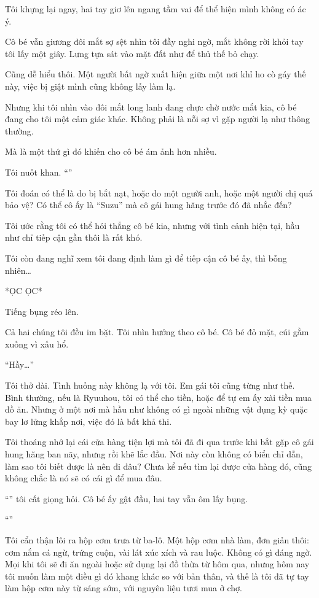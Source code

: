 \documentclass[../main.tex]{subfiles}
\begin{document}
Tôi khựng lại ngay, hai tay giơ lên ngang tầm vai để thể hiện mình không có ác ý. 

Cô bé vẫn giương đôi mắt sợ sệt nhìn tôi đầy nghi ngờ, mắt không rời khỏi tay tôi lấy một giây. Lưng tựa sát vào mặt đất như để thủ thế bỏ chạy.

Cũng dễ hiểu thôi. Một người bất ngờ xuất hiện giữa một nơi khỉ ho cò gáy thế này, việc bị giật mình cũng không lấy làm lạ.

Nhưng khi tôi nhìn vào đôi mắt long lanh đang chực chờ nước mắt kia, cô bé đang cho tôi một cảm giác khác. Không phải là nỗi sợ vì gặp người lạ như thông thường.

Mà là một thứ gì đó khiến cho cô bé ám ảnh hơn nhiều.

Tôi nuốt khan. ``\textit{}''

Tôi đoán có thể là do bị bắt nạt, hoặc do một người anh, hoặc một người chị quá bảo vệ? Có thể cô ấy là ``Suzu'' mà cô gái hung hăng trước đó đã nhắc đến?

Tôi ước rằng tôi có thể hỏi thẳng cô bé kia, nhưng với tình cảnh hiện tại, hầu như chỉ tiếp cận gần thôi là rất khó.

Tôi còn đang nghĩ xem tôi đang định làm gì để tiếp cận cô bé ấy, thì bỗng nhiên\dots

*ỌC ỌC*

Tiếng bụng réo lên.

Cả hai chúng tôi đều im bặt. Tôi nhìn hướng theo cô bé. Cô bé đỏ mặt, cúi gằm xuống vì xấu hổ.

``Hầy\dots''

Tôi thở dài. Tình huống này không lạ với tôi. Em gái tôi cũng từng như thế. Bình thường, nếu là Ryuuhou, tôi có thể cho tiền, hoặc để tự em ấy xài tiền mua đồ ăn. Nhưng ở một nơi mà hầu như không có gì ngoài những vật dụng kỳ quặc bay lơ lửng khắp nơi, việc đó là bất khả thi.

Tôi thoáng nhớ lại cái cửa hàng tiện lợi mà tôi đã đi qua trước khi bắt gặp cô gái hung hăng ban nãy, nhưng rồi khẽ lắc đầu. Nơi này còn không có biển chỉ dẫn, làm sao tôi biết được là nên đi đâu? Chưa kể nếu tìm lại được cửa hàng đó, cũng không chắc là nó sẽ có cái gì để mua đâu.

``'' tôi cất giọng hỏi. Cô bé ấy gật đầu, hai tay vẫn ôm lấy bụng.

``''

Tôi cẩn thận lôi ra hộp cơm trưa từ ba-lô. Một hộp cơm nhà làm, đơn giản thôi: cơm nắm cá ngừ, trứng cuộn, vài lát xúc xích và rau luộc. Không có gì đáng ngờ. Mọi khi tôi sẽ đi ăn ngoài hoặc sử dụng lại đồ thừa từ hôm qua, nhưng hôm nay tôi muốn làm một điều gì đó khang khác so với bản thân, và thế là tôi đã tự tay làm hộp cơm này từ sáng sớm, với nguyên liệu tươi mua ở chợ.
\end{document}
